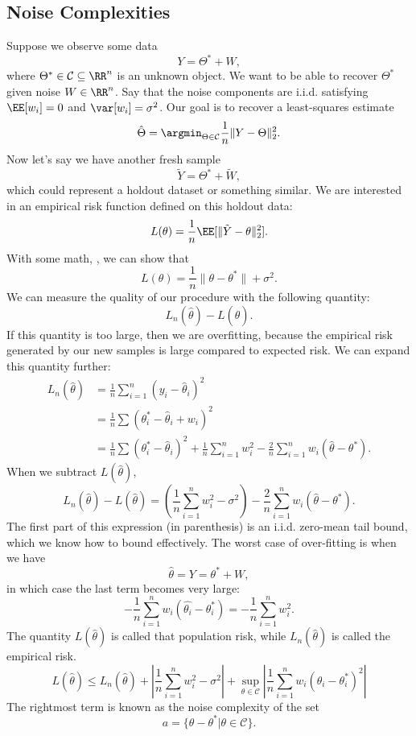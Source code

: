 \subsection{Noise Complexities}
Suppose we observe some data 
\[Y=\Theta^*+W,\] 
where $\Theta^*\in \mathcal{C}\subseteq \RR^n$ is an unknown object. We want to be able to recover $\Theta^*$ given noise $W\in \RR^n$. Say that the noise components are i.i.d. satisfying $\EE[w_i]=0$ and $\var[w_i]=\sigma^2$. Our goal is to recover a least-squares estimate 
\[\hat{\Theta} = \argmin_{\Theta\in \mathcal{C}}\frac{1}{n}\lVert Y-\Theta\rVert_2^2.\] 
Now let's say we have another fresh sample 
\[\tilde{Y} = \Theta^* + \tilde{W},\] 
which could represent a holdout dataset or something similar. We are interested in an empirical risk function defined on this holdout data: 
\[L(\theta) = \frac{1}{n}\EE[\lVert \tilde{Y}-\theta\rVert_2^2].\] 
With some math, , we can show that 
\[L(\theta) = \frac{1}{n}\lVert \theta - \theta^*\rVert + \sigma^2.\] 
We can measure the quality of our procedure with the following quantity: 
\[L_n(\hat{\theta}) - L(\hat{\theta}). \] 
If this quantity is too large, then we are overfitting, because the empirical risk generated by our new samples is large compared to expected risk. We can expand this quantity further: 
\begin{align*}
	L_n(\hat{\theta}) &= \frac{1}{n}\sum_{i=1}^n (y_i - \hat{\theta}_i)^2 \\
															&= \frac{1}{n}\sum (\theta_i^* - \hat{\theta}_i + w_i)^2 \\
															&= \frac{1}{n}\sum (\theta_i^* - \hat{\theta}_i)^2 + \frac{1}{n}\sum_{i=1}^n w_i^2 - \frac{2}{n}\sum_{i=1}^n w_i(\hat{\theta} - \theta^*). 
\end{align*}
When we subtract $L(\hat{\theta})$, 
\[L_n(\hat{\theta}) - L(\hat{\theta}) = \left(\frac{1}{n}\sum_{i=1}^n w_i^2 - \sigma^2\right) - \frac{2}{n}\sum_{i=1}^n w_i(\hat{\theta} - \theta^*).\] 
The first part of this expression (in parenthesis) is an i.i.d. zero-mean tail bound, which we know how to bound effectively. The worst case of over-fitting is when we have 
\[\hat{\theta} = Y = \theta^* + W,\]
in which case the last term becomes very large: 
\[-\frac{1}{n}\sum_{i=1}^n w_i(\hat{\theta_i} - \theta_i^*) = -\frac{1}{n}\sum_{i=1}^n w_i^2.\] 
The quantity $L(\hat{\theta})$ is called that \ac{population risk}, while $L_n(\hat{\theta})$ is called the \ac{empirical risk}. 
\[L(\hat{\theta}) \leq L_n(\hat{\theta}) + \left\vert \frac{1}{n}\sum_{i=1}^n w_i^2 - \sigma^2\right\vert + \sup_{\theta\in \mathcal{C}}\left\vert\frac{1}{n}\sum_{i=1}^n w_i(\theta_i-\theta_i^*)^2\right\vert\]
The rightmost term is known as the \ac{noise complexity} of the set 
\[a = \{\theta-\theta^*|\theta\in \mathcal{C}\}. \] 

